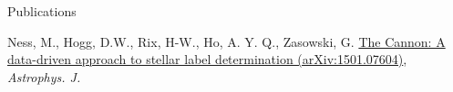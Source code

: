 \documentclass{resume} %
\begin{document}

\begin{rSection}{Publications}

Ness, M., Hogg, D.W., Rix, H-W., Ho, A. Y. Q., Zasowski, G. \href{http://arxiv.org/abs/1501.07604}{The Cannon: A data-driven approach to stellar label determination (arXiv:1501.07604)}, {\em Astrophys. J.} 

\end{rSection}

\end{document}
